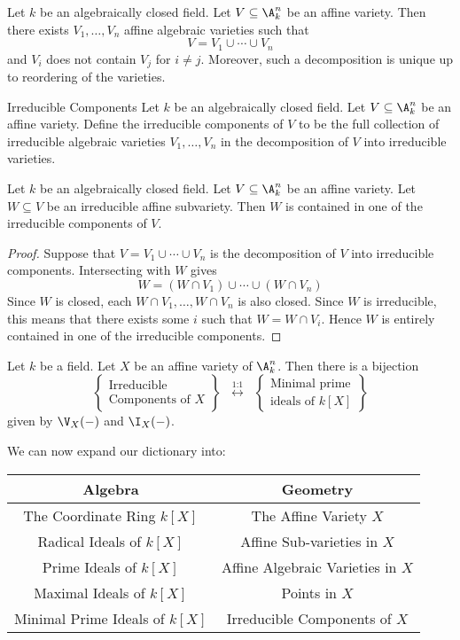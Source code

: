 \documentclass[a4paper]{article}
\begin{document}
\begin{prp}{}{} Let $k$ be an algebraically closed field. Let $V\subseteq\A_k^n$ be an affine variety. Then there exists $V_1,\dots,V_n$ affine algebraic varieties such that $$V=V_1\cup\cdots\cup V_n$$ and $V_i$ does not contain $V_j$ for $i\neq j$. Moreover, such a decomposition is unique up to reordering of the varieties. 
\end{prp}

\begin{defn}{Irreducible Components}{} Let $k$ be an algebraically closed field. Let $V\subseteq\A_k^n$ be an affine variety. Define the irreducible components of $V$ to be the full collection of irreducible algebraic varieties $V_1,\dots,V_n$ in the decomposition of $V$ into irreducible varieties. 
\end{defn}

\begin{lmm}{}{} Let $k$ be an algebraically closed field. Let $V\subseteq\A_k^n$ be an affine variety. Let $W\subseteq V$ be an irreducible affine subvariety. Then $W$ is contained in one of the irreducible components of $V$. 
\begin{proof}
Suppose that $V=V_1\cup\cdots\cup V_n$ is the decomposition of $V$ into irreducible components. Intersecting with $W$ gives $$W=(W\cap V_1)\cup\cdots\cup(W\cap V_n)$$ Since $W$ is closed, each $W\cap V_1,\dots,W\cap V_n$ is also closed. Since $W$ is irreducible, this means that there exists some $i$ such that $W=W\cap V_i$. Hence $W$ is entirely contained in one of the irreducible components. 
\end{proof}
\end{lmm}

\begin{lmm}{}{} Let $k$ be a field. Let $X$ be an affine variety of $\A_k^n$. Then there is a bijection $$\left\{\substack{\text{Irreducible}\\\text{Components of } X}\right\}\;\;\overset{\text{1:1}}{\longleftrightarrow}\;\;\left\{\substack{\text{Minimal prime}\\\text{ideals of }k[X]}\right\}$$ given by $\V_X(-)$ and $\I_X(-)$. 
\end{lmm}

We can now expand our dictionary into: \\
\begin{center}\begin{tabular}{c|c}
Algebra & Geometry\\
\hline
The Coordinate Ring $k[X]$ & The Affine Variety $X$\\
Radical Ideals of $k[X]$ & Affine Sub-varieties in $X$\\
Prime Ideals of $k[X]$ & Affine Algebraic Varieties in $X$\\
Maximal Ideals of $k[X]$ & Points in $X$\\
Minimal Prime Ideals of $k[X]$ & Irreducible Components of $X$
\end{tabular}\end{center}
\end{document}
